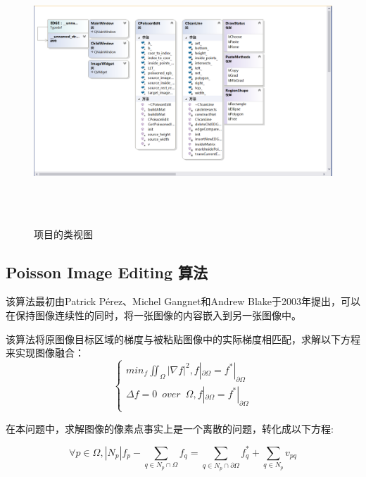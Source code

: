 \documentclass{article}
\begin{document}
		\begin{figure}[H]
		\begin{center}
			
			\includegraphics[width=18cm,height=10cm]{shitu}
			
			\caption{项目的类视图} \label{shitu.label}
		\end{center}
	\end{figure}
	

	
	\subsection{Poisson Image Editing 算法}
	
	该算法最初由Patrick Pérez、Michel Gangnet和Andrew Blake于2003年提出，可以在保持图像连续性的同时，将一张图像的内容嵌入到另一张图像中。
	
	该算法将原图像目标区域的梯度与被粘贴图像中的实际梯度相匹配，求解以下方程来实现图像融合：
		$$	\left\{ 
	\begin{array}{lc}
		min_f\iint_{\Omega}\left\vert \nabla f  \right\vert^2, f|_{\partial \Omega}=f^{\ast}|_{\partial \Omega}\\
		\Delta f=0 \enspace over \enspace \Omega , f|_{\partial \Omega}=f^{\ast}|_{\partial \Omega}\\
	\end{array}
	\right.$$
	
	在本问题中，求解图像的像素点事实上是一个离散的问题，转化成以下方程:
	
	 $$ \forall p\in \Omega, \left\vert N_p \right\vert f_p - \sum\limits_{q\in N_p \cap \Omega}f_q = \sum\limits_{q\in N_p \cap \partial \Omega}f^{\ast}_q + \sum\limits_{q\in N_p}v_{pq}$$
	 
\end{document}
